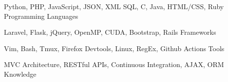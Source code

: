 

\begin{cventries}

\begin{minipage}[c]{0.5\textwidth}
  \cventry %
    {
        Python,
        PHP,
        JavaScript,
        JSON,
        XML
        SQL,
        C,
        Java,
        HTML/CSS,
        Ruby
    } 
    {Programming Languages} %
    {} %
    {} %
    {}

  \cventry %
    {
        Laravel,
        Flask,
        jQuery,
        OpenMP,
        CUDA,
        Bootstrap,
        Rails
    }
    {Frameworks} %
    {} %
    {} %
    {}

 \end{minipage}\begin{minipage}[c]{0.5\textwidth}        
  \cventry
    {
        Vim,
        Bash,
        Tmux,
        Firefox Devtools,
        Linux,
        RegEx,
        Github Actions
    }
    {Tools} %
    {} %
    {} %
    {}

  \cventry
    {
        MVC Architecture,
        RESTful APIs,
        Continuous Integration,
        AJAX,
        ORM
    }
    {Knowledge} %
    {} %
    {} %
    {}

\end{minipage}
\end{cventries}
